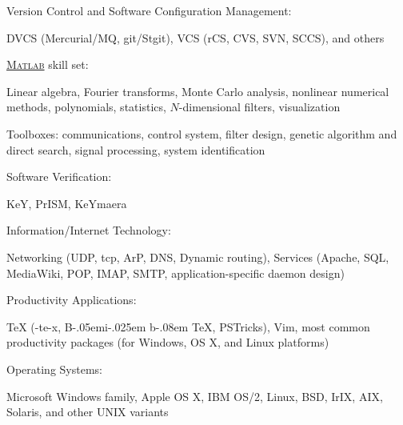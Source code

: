 \documentclass{article}
\newcommand{\halfblankline}{\quad\vspace{-0.5\baselineskip}\pagebreak[3]}
\providecommand\BibTeX{{B\kern-.05em{\sc i\kern-.025em b}\kern-.08em
    \TeX}}
\providecommand\Matlab{\textsc{Matlab}}
\begin{document}
\halfblankline

Version Control and Software Configuration Management:
%
\begin{innerlist}
    \item DVCS (Mercurial/MQ, git/Stgit), VCS (rCS, CVS, SVN, SCCS), and
        others
\end{innerlist}

\halfblankline

\href{http://www.mathworks.com/products/matlab/}{\Matlab} skill set:
%
\begin{innerlist}
    \item Linear algebra, Fourier transforms, Monte Carlo analysis,
        nonlinear numerical methods, polynomials, statistics,
        $N$-dimensional filters, visualization

    \item Toolboxes: communications, control system, filter design,
        genetic algorithm and direct search, signal processing, system
        identification
\end{innerlist}

\halfblankline

Software Verification:
%
\begin{innerlist}
    \item KeY, PrISM, KeYmaera
\end{innerlist}

\halfblankline

Information/Internet Technology:
%
\begin{innerlist}
    \item Networking (UDP, tcp, ArP, DNS, Dynamic
        routing), Services (Apache, SQL, MediaWiki, POP, IMAP, SMTP,
        application-specific daemon design)
\end{innerlist}

\halfblankline

Productivity Applications:
%
\begin{innerlist}
    \item \TeX{} (\la-te-x{}, \BibTeX{}, PSTricks), Vim,
        most common productivity packages (for Windows, OS X, and Linux
        platforms)
\end{innerlist}

\halfblankline

Operating Systems:
%
\begin{innerlist}
    \item Microsoft Windows family, Apple OS X, IBM OS/2, Linux, BSD,
        IrIX, AIX, Solaris, and other UNIX variants
\end{innerlist}
\end{document}
